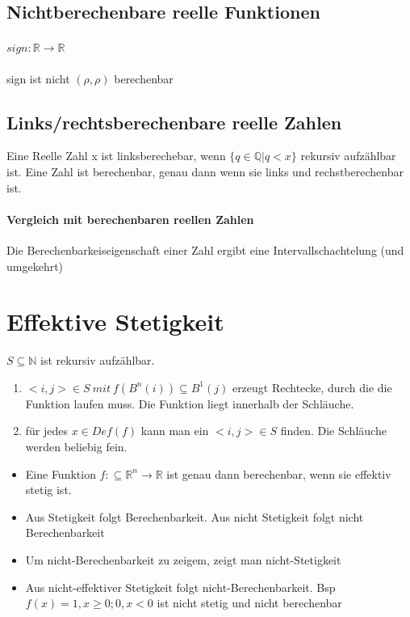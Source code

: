 \documentclass[ngerman]{scrartcl}
\begin{document}
\subsection{Nichtberechenbare reelle Funktionen}
\paragraph{$ sign : \mathbb{R} \rightarrow \mathbb{R} $} sign ist nicht $ (\rho, \rho)$ berechenbar


\subsection{Links/rechtsberechenbare reelle Zahlen}
Eine Reelle Zahl x ist linksberechebar, wenn $ \{q \in \mathbb{Q} | q < x  \}  $ rekursiv aufzählbar ist.  Eine Zahl ist berechenbar, genau dann wenn sie links und rechstberechenbar ist.


\paragraph{Vergleich mit berechenbaren reellen Zahlen}
Die Berechenbarkeiseigenschaft einer Zahl ergibt eine Intervallschachtelung (und umgekehrt)


%
%
\section{Effektive Stetigkeit}
$ S \subseteq \mathbb{N} $ ist rekursiv aufzählbar.
\begin{enumerate}
  \item $ <i,j> \in S\ mit\ f(B^n(i))\subseteq B^1(j) $ erzeugt Rechtecke, durch die die Funktion laufen muss. Die Funktion liegt innerhalb der Schläuche.
  \item für jedes $ x\in Def(f) $ kann man ein $ <i,j> \in S $ finden. Die Schläuche werden beliebig fein.
\end{enumerate}

\begin{itemize}
  \item Eine Funktion $ f: \subseteq \mathbb{R}^n \rightarrow \mathbb{R} $ ist genau dann berechenbar, wenn sie effektiv stetig ist.
  \item Aus Stetigkeit folgt Berechenbarkeit. Aus nicht Stetigkeit folgt nicht Berechenbarkeit
  \item Um nicht-Berechenbarkeit zu zeigem, zeigt man nicht-Stetigkeit
  \item Aus nicht-effektiver Stetigkeit folgt nicht-Berechenbarkeit. Bsp $  f(x) = 1, x \geq 0; 0, x < 0 $ ist nicht stetig und nicht berechenbar
\end{itemize}
\end{document}
